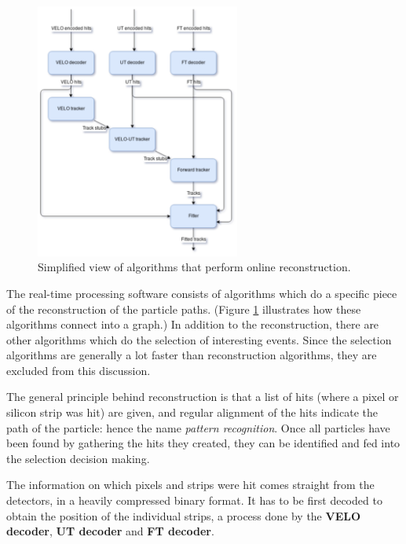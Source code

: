 \documentclass[12pt]{article}
\begin{document}
\begin{figure}[h]
	\begin{center}
		\includegraphics[width=0.6\textwidth]{algorithms_brunel}
	\end{center}
	\caption{Simplified view of algorithms that perform online reconstruction.}
	\label{fig_algorithms_brunel}
\end{figure}

The real-time processing software consists of algorithms which do a specific piece of the reconstruction of the particle paths. (Figure \ref{fig_algorithms_brunel} illustrates how these algorithms connect into a graph.) In addition to the reconstruction, there are other algorithms which do the selection of interesting events. Since the selection algorithms are generally a lot faster than reconstruction algorithms, they are excluded from this discussion.

The general principle behind reconstruction is that a list of hits (where a pixel or silicon strip was hit) are given, and regular alignment of the hits indicate the path of the particle: hence the name \textit{pattern recognition}. Once all particles have been found by gathering the hits they created, they can be identified and fed into the selection decision making.

The information on which pixels and strips were hit comes straight from the detectors, in a heavily compressed binary format. It has to be first decoded to obtain the position of the individual strips, a process done by the \textbf{VELO decoder}, \textbf{UT decoder} and \textbf{FT decoder}.
\end{document}
